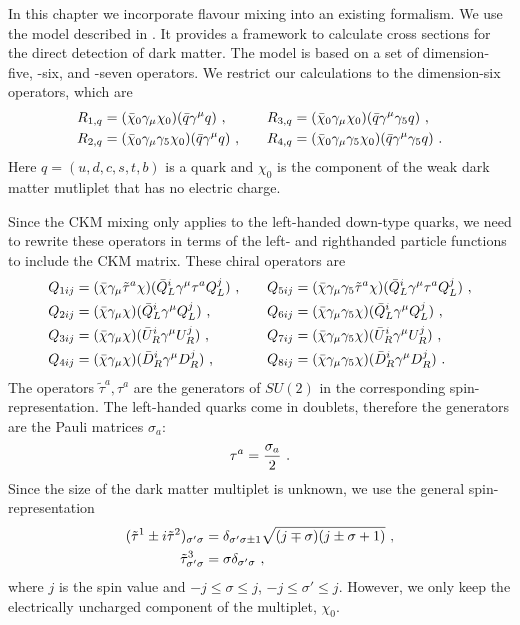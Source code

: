 In this chapter we incorporate flavour mixing into an existing formalism. We use the model described in \cite{ChiralEFT}. It provides a framework to calculate cross sections for the direct detection of dark matter. The model is based on a set of dimension-five, -six, and -seven operators. We restrict our calculations to the dimension-six operators, which are
\begin{align}\label{eq:normal}
	R_{1,q} &= (\bar{\chi}_0\gamma_\mu\chi_0)(\bar{q}\gamma^\mu q) \ , && &R_{3,q} &= (\bar{\chi}_0\gamma_\mu\chi_0)(\bar{q}\gamma^\mu\gamma_5q) \ , \notag \\
	R_{2,q} &= (\bar{\chi}_0\gamma_\mu\gamma_5\chi_0)(\bar{q}\gamma^\mu q) \ , &&	&R_{4,q} &= (\bar{\chi}_0\gamma_\mu\gamma_5\chi_0)(\bar{q}\gamma^\mu\gamma_5q) \ .
\end{align}
Here $q=(u,d,c,s,t,b)$ is a quark and $\chi_0$ is the component of the weak dark matter mutliplet that has no electric charge.


Since the CKM mixing only applies to the left-handed down-type quarks, we need to rewrite these operators in terms of the left- and righthanded particle functions to include the CKM matrix. These chiral operators are
\begin{align}\label{eq:chiral}
	Q_{1ij} &= (\bar{\chi}\gamma_\mu\tilde{\tau}^a\chi)(\bar{Q}_L^i\gamma^\mu \tau^aQ_L^j) \ , && &Q_{5ij} &= (\bar{\chi}\gamma_\mu\gamma_5\tilde{\tau}^a\chi)(\bar{Q}_L^i\gamma^\mu \tau^aQ_L^j) \ , \notag \\
	Q_{2ij} &= (\bar{\chi}\gamma_\mu\chi)(\bar{Q}_L^i\gamma^\mu Q_L^j) \ , && &Q_{6ij} &= (\bar{\chi}\gamma_\mu\gamma_5\chi)(\bar{Q}_L^i\gamma^\mu Q_L^j) \ , \notag \\
	Q_{3ij} &= (\bar{\chi}\gamma_\mu\chi)(\bar{U}_R^i\gamma^\mu U_R^j) \ , && &Q_{7ij} &= (\bar{\chi}\gamma_\mu\gamma_5\chi)(\bar{U}_R^i\gamma^\mu U_R^j) \ , \notag \\
	Q_{4ij} &= (\bar{\chi}\gamma_\mu\chi)(\bar{D}_R^i\gamma^\mu D_R^j) \ , && &Q_{8ij} &= (\bar{\chi}\gamma_\mu\gamma_5\chi)(\bar{D}_R^i\gamma^\mu D_R^j) \ .
\end{align}
The operators $\tilde{\tau}^a,\tau^a$ are the generators of $SU(2)$ in the corresponding spin-representation. The left-handed quarks come in doublets, therefore the generators are the Pauli matrices $\sigma_a$:
\begin{align}
	\tau^a = \frac{\sigma_a}{2} \ . \notag
\end{align}
Since the size of the dark matter multiplet is unknown, we use the general spin-representation
\begin{align}
	(\tilde{\tau}^1 \pm i\tilde{\tau}^2)_{\sigma'\sigma} &= \delta_{\sigma'\sigma\pm1}\sqrt{(j\mp\sigma)(j\pm\sigma+1)} \ , \notag \\
	\tilde{\tau}^3_{\sigma'\sigma} &= \sigma\delta_{\sigma'\sigma} \ , \notag
\end{align}
where $j$ is the spin value and $-j\leq\sigma\leq j$, $-j\leq\sigma'\leq j$. However, we only keep the electrically uncharged component of the multiplet, $\chi_0$.

